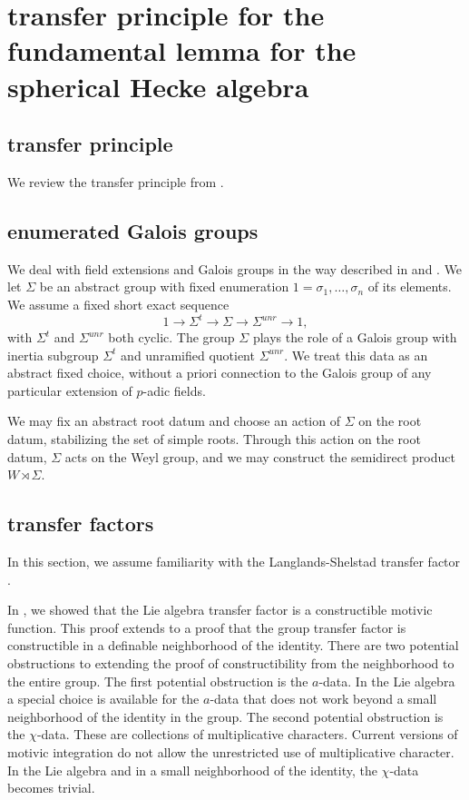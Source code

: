 \section{transfer principle for the fundamental lemma for the spherical Hecke algebra}


\subsection{transfer principle}

We review the transfer principle from \cite{cluckers2010constructible}.

\subsection{enumerated Galois groups}

We deal with field extensions and Galois groups in the way described in \cite{gordon} and \cite{cluckers2011transfer}.
We let $\Sigma$ be an abstract group with fixed enumeration $1=\sigma_1,\ldots,\sigma_n$ of its elements.  We
assume a fixed short exact sequence
\[
1\to \Sigma^t\to\Sigma\to\Sigma^{unr}\to 1,
\]
with $\Sigma^t$ and $\Sigma^{unr}$ both cyclic.
The group $\Sigma$ plays the role of a Galois group with inertia subgroup $\Sigma^t$ and unramified quotient $\Sigma^{unr}$.
We treat this data as an abstract fixed choice, without a priori connection to the Galois group of any particular extension of 
$p$-adic fields.  

We may fix an abstract root datum and choose an action of $\Sigma$ on the root datum, stabilizing the set of simple roots.
Through this action on the root datum, $\Sigma$ acts on the Weyl group, and we may construct the semidirect product $W\rtimes \Sigma$.

\subsection{transfer factors}

In this section, we assume familiarity with the Langlands-Shelstad transfer factor \cite{langlands1987definition}.

In \cite{gordon}, we showed that the Lie algebra transfer factor is a constructible motivic function.  This proof extends to a proof
that the group transfer factor is constructible in a definable neighborhood of the identity.  There are two potential obstructions to
extending the proof of constructibility from
the neighborhood to the entire group.  The first potential obstruction is the $a$-data.  In the Lie algebra a special choice is available
for the $a$-data that does not work beyond a small neighborhood of the identity in the group.   The second potential obstruction is 
the $\chi$-data.  These are collections of multiplicative characters.  Current versions of motivic integration do not allow the unrestricted
use of multiplicative character.  In the Lie algebra and in a small neighborhood of the identity, the $\chi$-data becomes trivial.

